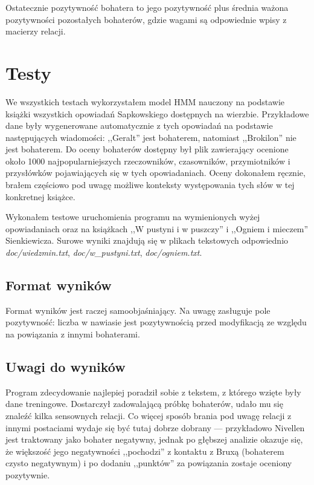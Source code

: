 \documentclass[10pt,a4paper]{article}
\begin{document}
		Ostatecznie pozytywność bohatera to jego pozytywność plus średnia ważona pozytywności pozostałych bohaterów, gdzie wagami są odpowiednie wpisy z macierzy relacji.

\section{Testy}

	We wszystkich testach wykorzystałem model HMM nauczony na podstawie książki wszystkich opowiadań Sapkowskiego dostępnych na wierzbie. Przykładowe dane były wygenerowane automatycznie z tych opowiadań na podstawie następujących wiadomości: ,,Geralt'' jest bohaterem, natomiast ,,Brokilon'' nie jest bohaterem. Do oceny bohaterów dostępny był plik zawierający ocenione około 1000 najpopularniejszych rzeczowników, czasowników, przymiotników i przysłówków pojawiających się w tych opowiadaniach. Oceny dokonałem ręcznie, brałem częściowo pod uwagę możliwe konteksty występowania tych słów w tej konkretnej książce.

	Wykonałem testowe uruchomienia programu na wymienionych wyżej opowiadaniach oraz na książkach ,,W pustyni i w puszczy'' i ,,Ogniem i mieczem'' Sienkiewicza. Surowe wyniki znajdują się w plikach tekstowych odpowiednio \emph{doc/wiedzmin.txt}, \emph{doc/w\_pustyni.txt}, \emph{doc/ogniem.txt}.

	\subsection{Format wyników}

		Format wyników jest raczej samoobjaśniający. Na uwagę zasługuje pole pozytywność: liczba w nawiasie jest pozytywnością przed modyfikacją ze względu na powiązania z innymi bohaterami.

	\subsection{Uwagi do wyników}

		Program zdecydowanie najlepiej poradził sobie z tekstem, z którego wzięte były dane treningowe. Dostarczył zadowalającą próbkę bohaterów, udało mu się znaleźć kilka sensownych relacji. Co więcej sposób brania pod uwagę relacji z innymi postaciami wydaje się być tutaj dobrze dobrany --- przykładowo Nivellen jest traktowany jako bohater negatywny, jednak po głębszej analizie okazuje się, że większość jego negatywności ,,pochodzi'' z kontaktu z Bruxą (bohaterem czysto negatywnym) i po dodaniu ,,punktów'' za powiązania zostaje oceniony pozytywnie.
\end{document}
